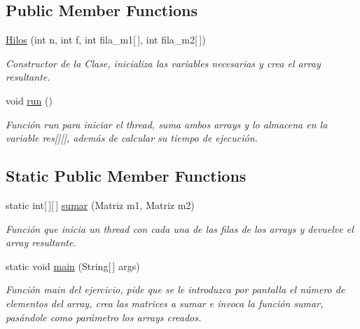 \subsection*{Public Member Functions}
\begin{DoxyCompactItemize}
\item 
\hyperlink{class_practica2_1_1_hilos_a2415cb95146d7a184ee18ffc20e8bbd6}{Hilos} (int n, int f, int fila\+\_\+m1\mbox{[}$\,$\mbox{]}, int fila\+\_\+m2\mbox{[}$\,$\mbox{]})
\begin{DoxyCompactList}\small\item\em Constructor de la Clase, inicializa las variables necesarias y crea el array resultante. \end{DoxyCompactList}\item 
\hypertarget{class_practica2_1_1_hilos_a25701049a60cb68fa20a2b94ecaf01d0}{}void \hyperlink{class_practica2_1_1_hilos_a25701049a60cb68fa20a2b94ecaf01d0}{run} ()\label{class_practica2_1_1_hilos_a25701049a60cb68fa20a2b94ecaf01d0}

\begin{DoxyCompactList}\small\item\em Función run para iniciar el thread, suma ambos arrays y lo almacena en la variable res\mbox{[}\mbox{]}\mbox{[}\mbox{]}, además de calcular su tiempo de ejecución. \end{DoxyCompactList}\end{DoxyCompactItemize}
\subsection*{Static Public Member Functions}
\begin{DoxyCompactItemize}
\item 
static int\mbox{[}$\,$\mbox{]}\mbox{[}$\,$\mbox{]} \hyperlink{class_practica2_1_1_hilos_acf21cb1773256bf75be2bfa3246b5bed}{sumar} (Matriz m1, Matriz m2)
\begin{DoxyCompactList}\small\item\em Función que inicia un thread con cada una de las filas de los arrays y devuelve el array resultante. \end{DoxyCompactList}\item 
\hypertarget{class_practica2_1_1_hilos_a7a6c0033a27bcf745d29a99012114cee}{}static void \hyperlink{class_practica2_1_1_hilos_a7a6c0033a27bcf745d29a99012114cee}{main} (String\mbox{[}$\,$\mbox{]} args)\label{class_practica2_1_1_hilos_a7a6c0033a27bcf745d29a99012114cee}

\begin{DoxyCompactList}\small\item\em Función main del ejercicio, pide que se le introduzca por pantalla el número de elementos del array, crea las matrices a sumar e invoca la función sumar, pasándole como parámetro los arrays creados. \end{DoxyCompactList}\end{DoxyCompactItemize}
